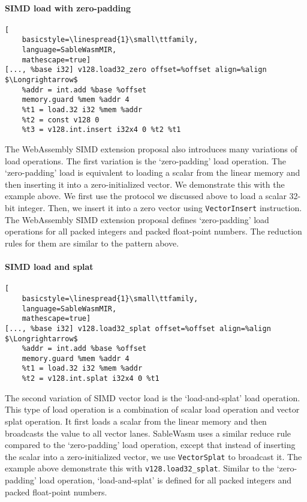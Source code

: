 \paragraph{SIMD load with zero-padding} \quad
\begin{lstlisting}[
    basicstyle=\linespread{1}\small\ttfamily, 
    language=SableWasmMIR, 
    mathescape=true]
[..., %base i32] v128.load32_zero offset=%offset align=%align $\Longrightarrow$
    %addr = int.add %base %offset
    memory.guard %mem %addr 4
    %t1 = load.32 i32 %mem %addr
    %t2 = const v128 0
    %t3 = v128.int.insert i32x4 0 %t2 %t1
\end{lstlisting}
The WebAssembly SIMD extension proposal also introduces many variations of load
operations. The first variation is the `zero-padding' load operation. The
`zero-padding' load is equivalent to loading a scalar from the linear memory and
then inserting it into a zero-initialized vector. We demonstrate this with the
example above. We first use the protocol we discussed above to load a scalar
32-bit integer. Then, we insert it into a zero vector using
\texttt{VectorInsert} instruction. The WebAssembly SIMD extension proposal
defines `zero-padding' load operations for all packed integers and
packed float-point numbers. The reduction rules for them are similar to the
pattern above.

\paragraph{SIMD load and splat} \quad
\begin{lstlisting}[
    basicstyle=\linespread{1}\small\ttfamily, 
    language=SableWasmMIR, 
    mathescape=true]
[..., %base i32] v128.load32_splat offset=%offset align=%align $\Longrightarrow$
    %addr = int.add %base %offset
    memory.guard %mem %addr 4
    %t1 = load.32 i32 %mem %addr
    %t2 = v128.int.splat i32x4 0 %t1
\end{lstlisting}
The second variation of SIMD vector load is the `load-and-splat' load operation.
This type of load operation is a combination of scalar load operation and vector
splat operation. It first loads a scalar from the linear memory and then
broadcasts the value to all vector lanes. SableWasm uses a similar reduce rule
compared to the `zero-padding' load operation, except that instead of inserting
the scalar into a zero-initialized vector, we use \texttt{VectorSplat} to
broadcast it. The example above demonstrate this with
\texttt{v128.load32\_splat}. Similar to the `zero-padding' load operation,
`load-and-splat' is defined for all packed integers and packed float-point
numbers.

